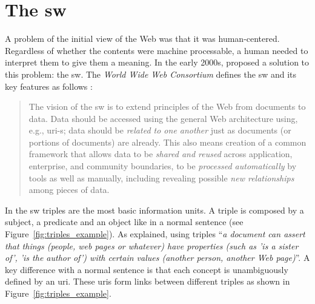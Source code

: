 \section{The \acl{sw}}
\label{sec:soa_sw}

A problem of the initial view of the Web was that it was human-centered.
Regardless of whether the contents were machine processable, a human needed to interpret them to give them a meaning.
In the early 2000s, \citet{berners-lee_semantic_2001} proposed a solution to this problem: the \acf{sw}.
The \emph{World Wide Web Consortium} defines the \ac{sw} and its key features as follows \citep{semanticWeb-FAQ}:
\begin{quote}
The vision of the \acl{sw} is to extend principles of the Web from documents to data.
Data should be accessed using the general Web architecture using, e.g., \acs{uri}-s;
data should be \emph{related to one another} just as documents (or portions of documents) are already.
This also means creation of a common framework that allows data to be \emph{shared and reused} across application, enterprise, and community boundaries,
to be \emph{processed automatically} by tools as well as manually, including revealing possible \emph{new relationships} among pieces of data.
\end{quote}


In the \ac{sw} triples are the most basic information units.
A triple is composed by a subject, a predicate and an object like in a normal sentence (see Figure~\ref{fig:triples_example}).
As \citeauthor{berners-lee_semantic_2001} explained, using triples ``\emph{a document can assert that things (people, web pages or whatever) have properties (such as 'is a sister of', 'is the author of') with certain values (another person, another Web page)}''.
A key difference with a normal sentence is that each concept is unambiguously defined by an \acs{uri}.
These \acsp{uri} form links between different triples as shown in Figure~\ref{fig:triples_example}.


